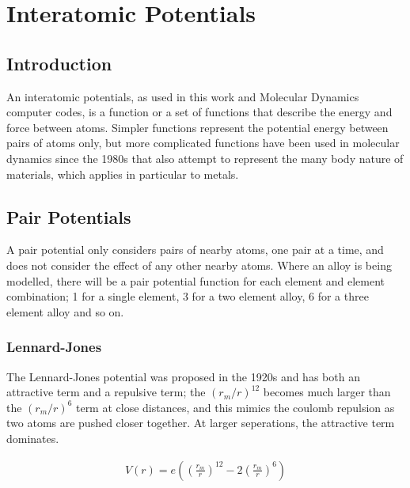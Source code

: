 \section{Interatomic Potentials}

\subsection{Introduction}

An interatomic potentials, as used in this work and Molecular Dynamics computer codes, is a function or a set of functions that describe the energy and force between atoms.  Simpler functions represent the potential energy between pairs of atoms only, but more complicated functions have been used in molecular dynamics since the 1980s that also attempt to represent the many body nature of materials, which applies in particular to metals.


\subsection{Pair Potentials}

A pair potential only considers pairs of nearby atoms, one pair at a time, and does not consider the effect of any other nearby atoms.  Where an alloy is being modelled, there will be a pair potential function for each element and element combination; 1 for a single element, 3 for a two element alloy, 6 for a three element alloy and so on.


\FloatBarrier
\subsubsection{Lennard-Jones}

The Lennard-Jones potential was proposed in the 1920s and has both an attractive term and a repulsive term; the $(r_m/r)^12$ becomes much larger than the $(r_m/r)^6$ term at close distances, and this mimics the coulomb repulsion as two atoms are pushed closer together.  At larger seperations, the attractive term dominates.

\begin{equation}
\begin{split}
V(r) = e \left(\left(\frac{r_m}{r}\right)^12 - 2 \left(\frac{r_m}{r}\right)^6\right)
\end{split}
\label{eq:eqLennardJones}
\end{equation}

